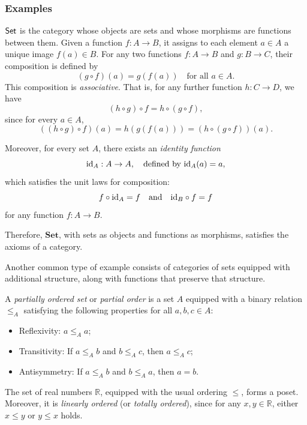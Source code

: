 \subsubsection{Examples}


\begin{example}
 $\mathsf{Set}$ is the category whose objects are sets and whose  morphisms are functions between them. Given a function \(f: A \to B\), it assigns to each element \(a \in A\) a unique image \(f(a) \in B\). 
 For any two functions \(f: A \to B\) and \(g: B \to C\), their composition is defined by
$$
(g \circ f)(a) = g(f(a)) \quad \text{for all } a \in A.
$$
This composition is \emph{associative}. That is, for any further function \(h: C \to D\), we have
\[
(h \circ g) \circ f = h \circ (g \circ f),
\]
since for every \(a \in A\),
\[
((h \circ g) \circ f)(a) = h(g(f(a))) = (h \circ (g \circ f))(a).
\]

Moreover, for every set \(A\), there exists an \emph{identity function}
\[
\mathrm{id}_A : A \to A, \quad \text{defined by } \mathrm{id}_A(a) = a,
\]
which satisfies the unit laws for composition:
\[
f \circ \mathrm{id}_A = f \quad \text{and} \quad \mathrm{id}_B \circ f = f
\]
for any function \(f: A \to B\).

Therefore, \(\mathbf{Set}\), with sets as objects and functions as morphisms, satisfies the axioms of a category.
\end{example}

Another common type of example consists of categories of sets equipped with additional structure, along with functions that preserve that structure.


\begin{definition}
A \emph{partially ordered set} or \emph{partial order} is a set $A$ equipped with a binary relation $\leq_A$ satisfying the following properties for all $a, b, c \in A$:
\begin{itemize}
    \item Reflexivity: $a \leq_A a$;
    \item Transitivity: If $a \leq_A b$ and $b \leq_A c$, then $a \leq_A c$;
    \item Antisymmetry: If $a \leq_A b$ and $b \leq_A a$, then $a = b$.
\end{itemize}
\end{definition}

\begin{example}
The set of real numbers \(\mathbb{R}\), equipped with the usual ordering \(\leq\), forms a poset. Moreover, it is \emph{linearly ordered} (or \emph{totally ordered}), since for any \(x, y \in \mathbb{R}\), either \(x \leq y\) or \(y \leq x\) holds.
\end{example}

